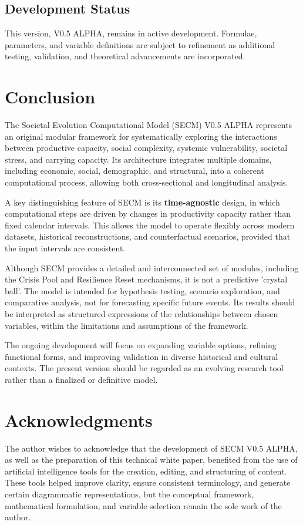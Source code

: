 \documentclass[12pt,a4paper]{article}
\begin{document}
\subsection{Development Status}
This version, V0.5 ALPHA, remains in active development. Formulae, parameters, and variable definitions are subject to refinement as additional testing, validation, and theoretical advancements are incorporated.
\section{Conclusion}

The Societal Evolution Computational Model (SECM) V0.5 ALPHA represents an original modular framework for systematically exploring the interactions between productive capacity, social complexity, systemic vulnerability, societal stress, and carrying capacity.  
Its architecture integrates multiple domains, including economic, social, demographic, and structural, into a coherent computational process, allowing both cross-sectional and longitudinal analysis.

A key distinguishing feature of SECM is its \textbf{time-agnostic} design, in which computational steps are driven by changes in productivity capacity rather than fixed calendar intervals. This allows the model to operate flexibly across modern datasets, historical reconstructions, and counterfactual scenarios, provided that the input intervals are consistent.

Although SECM provides a detailed and interconnected set of modules, including the Crisis Pool and Resilience Reset mechanisms, it is not a predictive 'crystal ball'. The model is intended for hypothesis testing, scenario exploration, and comparative analysis, not for forecasting specific future events.  
Its results should be interpreted as structured expressions of the relationships between chosen variables, within the limitations and assumptions of the framework.

The ongoing development will focus on expanding variable options, refining functional forms, and improving validation in diverse historical and cultural contexts. The present version should be regarded as an evolving research tool rather than a finalized or definitive model.
\section{Acknowledgments}

The author wishes to acknowledge that the development of SECM V0.5 ALPHA, as well as the preparation of this technical white paper, benefited from the use of artificial intelligence tools for the creation, editing, and structuring of content.  
These tools helped improve clarity, ensure consistent terminology, and generate certain diagrammatic representations, but the conceptual framework, mathematical formulation, and variable selection remain the sole work of the author.
\end{document}
